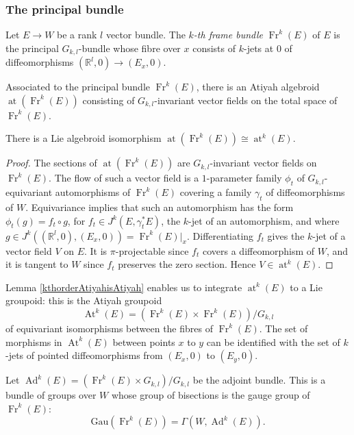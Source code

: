 \documentclass[10pt]{amsart}
\newcommand{\Fr}{{\operatorname{Fr}}}
\DeclareMathOperator{\At}{At}
\DeclareMathOperator{\Ad}{Ad}
\DeclareMathOperator{\at}{at}
\numberwithin{theoremalpha}{section}
\numberwithin{equation}{section}
\numberwithin{definition}{section}
\numberwithin{theorem}{section}
\numberwithin{proposition}{section}
\numberwithin{lemma}{section}
\numberwithin{example}{section}
\numberwithin{remark}{section}
\numberwithin{corollary}{section}
\numberwithin{question}{section}
\numberwithin{problem}{section}
\numberwithin{assumption}{section}
\theoremstyle{named}
\numberwithin{equation}{section}
\begin{document}
\subsubsection{The principal bundle}
\begin{definition}
Let $E \to W$ be a rank $l$ vector bundle. The \emph{$k$-th frame bundle} $\Fr^{k}(E)$ of $E$ is the principal $G_{k,l}$-bundle whose fibre over $x$ consists of $k$-jets at $0$ of diffeomorphisms $(\mathbb{R}^l,0) \to (E_{x}, 0)$. 
\end{definition}

Associated to the principal bundle $\Fr^{k}(E)$, there is an Atiyah algebroid $\at(\Fr^{k}(E))$ consisting of $G_{k,l}$-invariant vector fields on the total space of $\Fr^{k}(E)$. 
\begin{lemma} \label{kthorderAtiyahisAtiyah}
There is a Lie algebroid isomorphism $\at(\Fr^{k}(E)) \cong \at^{k}(E)$. 
\end{lemma}
\begin{proof}
The sections of $\at(\Fr^{k}(E))$ are $G_{k,l}$-invariant vector fields on $\Fr^{k}(E)$. The flow of such a vector field is a $1$-parameter family $\phi_{t}$ of $G_{k,l}$-equivariant automorphisms of $\Fr^{k}(E)$ covering a family $\gamma_{t}$ of diffeomorphisms of $W$. Equivariance implies that such an automorphism has the form $\phi_{t}(g) = f_{t} \circ g$, for $f_{t} \in J^k(E, \gamma_{t}^*E)$, the $k$-jet of an automorphism, and where $g \in J^{k}((\mathbb{R}^l,0), (E_{x}, 0)) = \Fr^{k}(E)|_{x}$. Differentiating $f_{t}$ gives the $k$-jet of a vector field $V$ on $E$. It is $\pi$-projectable since $f_{t}$ covers a diffeomorphism of $W$, and it is tangent to $W$ since $f_{t}$ preserves the zero section. Hence $V \in \at^{k}(E)$. 
\end{proof}

Lemma \ref{kthorderAtiyahisAtiyah} enables us to integrate $\at^{k}(E)$ to a Lie groupoid: this is the Atiyah groupoid 
\[
\At^{k}(E) = (\Fr^{k}(E) \times \Fr^{k}(E))/G_{k,l}
\]
of equivariant isomorphisms between the fibres of $\Fr^{k}(E)$. The set of morphisms in $\At^{k}(E)$ between points $x$ to $y$ can be identified with the set of $k$-jets of pointed diffeomorphisms from $(E_x,0)$ to $(E_{y},0)$. 

Let $\Ad^k(E) = (\Fr^k(E) \times G_{k,l})/G_{k,l}$ be the adjoint bundle. This is a bundle of groups over $W$ whose group of bisections is the gauge group of $\Fr^k(E)$: 
\[
\mathrm{Gau}(\Fr^k(E)) = \Gamma(W, \Ad^{k}(E)). 
\] 
\end{document}
